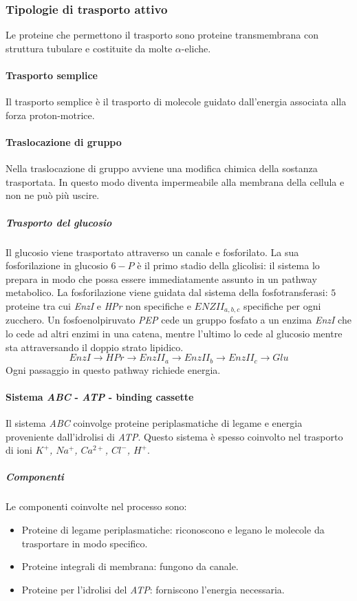 		\subsubsection{Tipologie di trasporto attivo}
		Le proteine che permettono il trasporto sono proteine transmembrana con struttura tubulare e costituite da molte $\alpha$-eliche.

			\paragraph{Trasporto semplice}
			Il trasporto semplice \`e il trasporto di molecole guidato dall'energia associata alla forza proton-motrice.

			\paragraph{Traslocazione di gruppo}
			Nella traslocazione di gruppo avviene una modifica chimica della sostanza trasportata.
			In questo modo diventa impermeabile alla membrana della cellula e non ne pu\`o pi\`u uscire.

				\subparagraph{Trasporto del glucosio}
				Il glucosio viene trasportato attraverso un canale e fosforilato.
				La sua fosforilazione in glucosio $6-P$ \`e il primo stadio della glicolisi: il sistema lo prepara in modo che possa essere immediatamente assunto in un pathway metabolico.
				La fosforilazione viene guidata dal sistema della fosfotransferasi: $5$ proteine tra cui \emph{EnzI} e \emph{HPr} non specifiche e \emph{$ENZII_{a,b,c}$} specifiche per ogni zucchero.
				Un fosfoenolpiruvato \emph{PEP} cede un gruppo fosfato a un enzima \emph{EnzI} che lo cede ad altri enzimi in una catena, mentre l'ultimo lo cede al glucosio mentre sta attraversando il doppio strato lipidico.
				\[EnzI\rightarrow HPr\rightarrow EnzII_a\rightarrow EnzII_b\rightarrow EnzII_c\rightarrow Glu\]
				Ogni passaggio in questo pathway richiede energia.

			\paragraph{Sistema \emph{ABC} - \emph{ATP} - binding cassette}
			Il sistema \emph{ABC} coinvolge proteine periplasmatiche di legame e energia proveniente dall'idrolisi di \emph{ATP}.
			Questo sistema \`e spesso coinvolto nel trasporto di ioni \emph{$K^+$, $Na^+$, $Ca^{2+}$, $Cl^-$, $H^+$}.
			
				\subparagraph{Componenti}
				Le componenti coinvolte nel processo sono:
				\begin{multicols}{2}
					\begin{itemize}
						\item Proteine di legame periplasmatiche: riconoscono e legano le molecole da trasportare in modo specifico.
						\item Proteine integrali di membrana: fungono da canale.
						\item Proteine per l'idrolisi del \emph{ATP}: forniscono l'energia necessaria.
					\end{itemize}
				\end{multicols}


